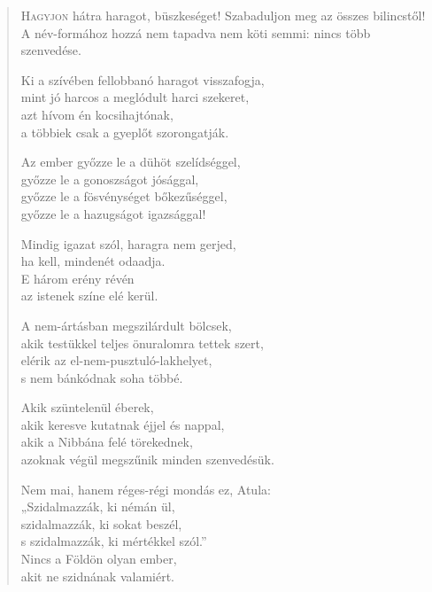 
\begin{verse}

{\par%
\lettrine{H}{agyjon} {\LettrineTextFont hátra haragot, büszkeséget!}\newline
Szabaduljon meg az összes bilincstől!\newline
A név-formához hozzá nem tapadva\verselinebreak
nem köti semmi: nincs több szenvedése.
\par}

 Ki a szívében fellobbanó haragot visszafogja,\\
mint jó harcos a meglódult harci szekeret,\\
azt hívom én kocsihajtónak,\\
a többiek csak a gyeplőt szorongatják.

 Az ember győzze le a dühöt szelídséggel,\\
győzze le a gonoszságot jósággal,\\
győzze le a fösvénységet bőkezűséggel,\\
győzze le a hazugságot igazsággal!

 Mindig igazat szól, haragra nem gerjed,\\
ha kell, mindenét odaadja.\\
E három erény révén\\
az istenek színe elé kerül.

 A nem-ártásban megszilárdult bölcsek,\\
akik testükkel teljes önuralomra tettek szert,\\
elérik az el-nem-pusztuló-lakhelyet,\\
s nem bánkódnak soha többé.

 Akik szüntelenül éberek,\\
akik keresve kutatnak éjjel és nappal,\\
akik a Nibbána felé törekednek,\\
azoknak végül megszűnik minden szenvedésük.

 Nem mai, hanem réges-régi mondás ez, Atula:\\
„Szidalmazzák, ki némán ül,\\
szidalmazzák, ki sokat beszél,\\
s szidalmazzák, ki mértékkel szól.”\\
Nincs a Földön olyan ember,\\
akit ne szidnának valamiért.


\end{verse}
